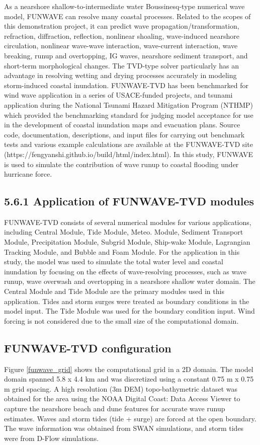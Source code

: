 \documentclass[11pt]{article}
\begin{document}
As a nearshore shallow-to-intermediate water Boussinesq-type numerical wave model, FUNWAVE can resolve many coastal processes. Related to the scopes of this demonstration project, it can predict wave propagation/transformation, refraction, diffraction, reflection, nonlinear shoaling, wave-induced nearshore circulation, nonlinear wave-wave interaction, wave-current interaction, wave breaking, runup and overtopping, IG waves, nearshore sediment transport, and short-term morphological changes. The TVD-type solver particularly has an advantage in resolving wetting and drying processes accurately in modeling storm-induced coastal inundation. FUNWAVE-TVD has been benchmarked for wind wave application in a series of USACE-funded projects, and tsunami application during the National Tsunami Hazard Mitigation Program (NTHMP) which provided the benchmarking standard for judging model acceptance for use in the development of coastal inundation maps and evacuation plans. Source code, documentation, descriptions, and input files for carrying out benchmark tests and various example calculations are available at the FUNWAVE-TVD site (https://fengyanshi.github.io/build/html/index.html). In this study, FUNWAVE is used to simulate the contribution of wave runup to coastal flooding under hurricane force.

\subsection*{5.6.1 Application of FUNWAVE-TVD modules} 
FUNWAVE-TVD consists of several numerical modules for various applications, including Central Module, Tide Module, Meteo. Module, Sediment Transport Module, Precipitation Module, Subgrid Module, Ship-wake Module, Lagrangian Tracking Module, and Bubble and Foam Module. For the application in this study, the model was used to simulate the total water level and coastal inundation by focusing on the effects of wave-resolving processes, such as wave runup, wave overwash and overtopping in a nearshore shallow water domain. The Central Module and Tide Module are the primary modules used in this application. Tides and storm surges were treated as boundary conditions in the model input. The Tide Module was used for the boundary condition input. Wind forcing is not considered due to the small size of the computational domain.

\subsection*{FUNWAVE-TVD configuration}
Figure \ref{funwave_grid} shows the computational grid in a 2D domain. The model domain spanned 5.8 x 4.4 km and was discretized using a constant 0.75 m x 0.75 m grid spacing. A high resolution (3m DEM) topo-bathymetric dataset was obtained for the area using the NOAA Digital Coast: Data Access Viewer to capture the nearshore beach and dune features for accurate wave runup estimates.  Waves and storm tides (tide + surge) are forced at the open boundary. The wave information was obtained from SWAN simulations, and storm tides were from D-Flow simulations.
\end{document}
